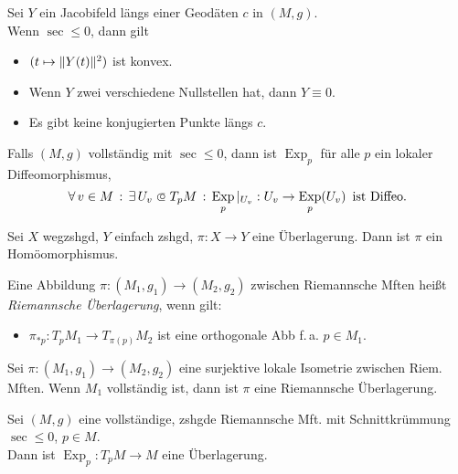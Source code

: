 \documentclass{cheat-sheet}
\DeclareMathOperator{\Exp}{Exp} %
\begin{document}


\begin{satz}
  Sei $Y$ ein Jacobifeld längs einer Geodäten $c$ in $(M, g)$. \\
  Wenn $\sec \leq 0$, dann gilt
  \begin{itemize}
    \item $(t \mapsto \lVert Y(t)\rVert^2)$ ist konvex.
    \item Wenn $Y$ zwei verschiedene Nullstellen hat, dann $Y \equiv 0$.
    \item Es gibt keine konjugierten Punkte längs $c$.
  \end{itemize}
\end{satz}

\begin{kor}
  Falls $(M, g)$ vollständig mit $\sec \leq 0$, dann ist $\Exp_p$ für alle $p$ ein lokaler Diffeomorphismus, \dh{}
  \[
    \fa{v \in M} \ex{U_v \opn T_p M} \Exp_p |_{U_v} : U_v \to \Exp_p(U_v)
    \enspace \text{ist Diffeo.}
  \]
\end{kor}

\begin{satz}
  Sei $X$ wegzshgd, $Y$ einfach zshgd, $\pi : X \to Y$ eine Überlagerung. Dann ist $\pi$ ein Homöomorphismus.
\end{satz}

\begin{defn}
  Eine Abbildung $\pi : (M_1, g_1) \to (M_2, g_2)$ zwischen Riemannsche Mften heißt \emph{Riemannsche Überlagerung}, wenn gilt:
  \begin{itemize}
    \item $\pi_{*p} : T_p M_1 \to T_{\pi(p)} M_2$ ist eine orthogonale Abb f.\,a. $p \in M_1$.
  \end{itemize}
\end{defn}

\begin{satz}
  Sei $\pi : (M_1, g_1) \to (M_2, g_2)$ eine surjektive lokale Isometrie zwischen Riem. Mften. Wenn $M_1$ vollständig ist, dann ist $\pi$ eine Riemannsche Überlagerung.
\end{satz}

\begin{satz}
  Sei $(M, g)$ eine vollständige, zshgde Riemannsche Mft. mit Schnittkrümmung $\sec \leq 0$, $p \in M$. \\
  Dann ist $\Exp_p : T_p M \to M$ eine Überlagerung.
\end{satz}
\end{document}
